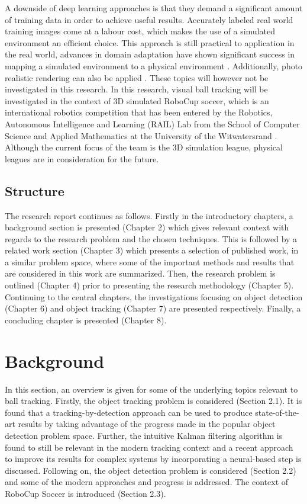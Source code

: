 \documentclass[a4paper,twoside,12pt]{report}
\begin{document}
A downside of deep learning approaches is that they demand a significant amount of training data in order to achieve useful results. Accurately labeled real world training images come at a labour cost, which makes the use of a simulated environment an efficient choice. This approach is still practical to application  in the real world, advances in domain adaptation have shown significant success in mapping a simulated environment to a physical environment \citep{domainadpt}. Additionally, photo realistic rendering can also be applied \citep{sim4cv}. These topics will however not be investigated in this research. In this research, visual ball tracking will be investigated in the context of 3D simulated RoboCup soccer, which is an international robotics competition  that has been entered by the Robotics, Autonomous Intelligence and Learning (RAIL) Lab from the School of Computer Science and Applied Mathematics at the University of the Witwatersrand \citep{witsfc}. Although the current focus of the team is the 3D simulation league, physical leagues are in consideration for the future. 

\section{Structure}

The research report continues as follows. Firstly in the introductory chapters, a background section is presented (Chapter 2) which gives relevant context with regards to the research problem and the chosen techniques. This is followed by a related work section (Chapter 3) which presents a selection of published work, in a similar problem space, where some of the important methods and results that are considered in this work are summarized. Then, the research problem is outlined (Chapter 4) prior to presenting the research methodology (Chapter 5). Continuing to the central chapters, the investigations focusing on object detection (Chapter 6) and object tracking (Chapter 7) are presented respectively. Finally, a concluding chapter is presented (Chapter 8).

\chapter{Background}

In this section, an overview is given for some of the underlying topics relevant to ball tracking. Firstly, the object tracking problem is considered (Section 2.1). It is found that a tracking-by-detection approach can be used to produce state-of-the-art results by taking advantage of the progress made in the popular object detection problem space. Further, the intuitive Kalman filtering algorithm is found to still be relevant in the modern tracking context and a recent approach to improve its results for complex systems by incorporating a neural-based step is discussed. Following on, the object detection problem is considered  (Section 2.2) and some of the modern approaches and progress is addressed. The context of RoboCup Soccer is introduced (Section 2.3).
\end{document}
